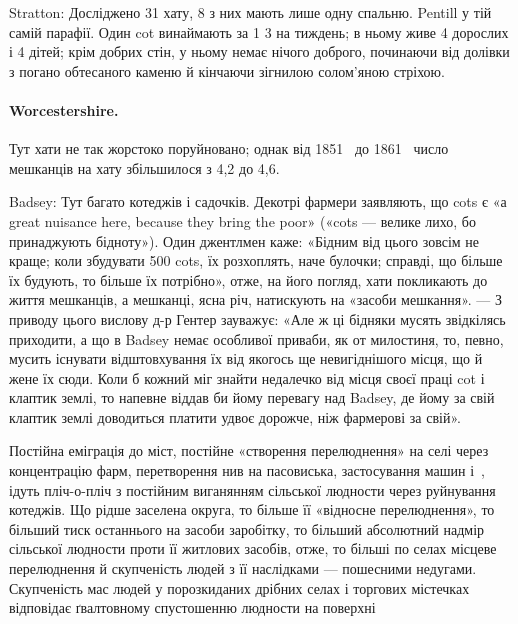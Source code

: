 Stratton: Досліджено 31 хату, 8 з них мають лише одну
спальню. Pentill у тій самій парафії. Один cot винаймають за
1 3 на тиждень; в ньому живе 4 дорослих і 4 дітей;
крім добрих стін, у ньому немає нічого доброго, починаючи від
долівки з погано обтесаного каменю й кінчаючи зігнилою солом’яною
стріхою.

\paragraph{Worcestershire.}

Тут хати не так жорстоко поруйновано; однак від 1851~ до
1861~ число мешканців на хату збільшилося з 4,2 до 4,6.

Badsey: Тут багато котеджів і садочків. Декотрі фармери
заявляють, що cots є «а great nuisance here, because they bring
the poor» («cots — велике лихо, бо принаджують бідноту»).
Один джентлмен каже: «Бідним від цього зовсім не краще; коли
збудувати 500 cots, їх розхоплять, наче булочки; справді, що
більше їх будують, то більше їх потрібно», отже, на його погляд,
хати покликають до життя мешканців, а мешканці, ясна річ,
натискують на «засоби мешкання». — З приводу цього вислову
д-р Гентер зауважує: «Але ж ці бідняки мусять звідкілясь
приходити, а що в Badsey немає особливої приваби, як от милостиня,
то, певно, мусить існувати відштовхування їх від якогось
ще невигіднішого місця, що й жене їх сюди. Коли б кожний міг
знайти недалечко від місця своєї праці cot і клаптик землі, то
напевне віддав би йому перевагу над Badsey, де йому за свій
клаптик землі доводиться платити удвоє дорожче, ніж фармерові
за свій».

Постійна еміграція до міст, постійне «створення перелюднення»
на селі через концентрацію фарм, перетворення нив на пасовиська,
застосування машин і~, ідуть пліч-о-пліч з постійним
виганянням сільської людности через руйнування котеджів.
Що рідше заселена округа, то більше її «відносне перелюднення»,
то більший тиск останнього на засоби заробітку, то більший
абсолютний надмір сільської людности проти її житлових
засобів, отже, то більші по селах місцеве перелюднення й скупченість
людей з її наслідками — пошесними недугами. Скупченість
мас людей у порозкиданих дрібних селах і торгових містечках
відповідає ґвалтовному спустошенню людности на поверхні
\parbreak{}  %

